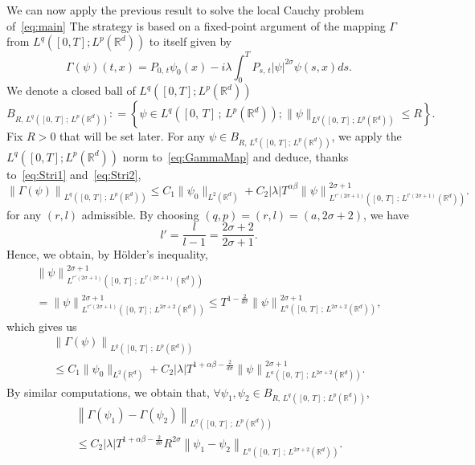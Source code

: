 \documentclass[AHL,Unicode,longabstracts,published]{cedram}
\newcommand{\bbR}{\mathbb{R}}
\let\oldforall\forall
\renewcommand*{\forall}{\mathrel{\oldforall}}
\begin{document}
We can now apply the previous result to solve the local Cauchy problem of~\eqref{eq:main} The strategy is based on a fixed-point argument of the mapping $\Gamma$ from $L^{q}([0,T];L^p(\bbR^d))$ to itself given by
\begin{equation}\label{eq:GammaMap}
\Gamma(\psi)(t,x) = P_{0,\,t}\psi_0(x) - i\lambda \int_0^T P_{s,\,t}|\psi|^{2\sigma}\psi(s,x) ds.
\end{equation}
We denote a closed ball of $L^{q}([0,T];L^p(\bbR^d))$
\[
B_{R,\,L^{q}\left([0,\,T]\,;\,L^p\left(\bbR^d\right)\right)} : = \left\{ \psi \in L^{q}\left([0,\,T]\,;\,L^p\left(\bbR^d\right)\right); \|\psi\|_{L^{q}\left([0,\,T]\,;\,L^p\left(\bbR^d\right)\right)} \leq R\right\}.
\]
Fix $R>0$ that will be set later. For any $\psi \in B_{R,\,L^{q}([0,\,T];\,L^p(\bbR^d))}$, we apply the $L^q([0,T];L^p(\bbR^d))$ norm to~\eqref{eq:GammaMap} and deduce, thanks to~\eqref{eq:Stri1} and~\eqref{eq:Stri2},
\[
\left\|\Gamma(\psi)\right\|_{L^{q}\left([0,\,T]\,;\,L^p\left(\bbR^d\right)\right)}\leq C_1\|\psi_0\|_{L^2\left(\bbR^d\right)} + C_2|\lambda| T^{\alpha\beta}\left\|\psi\right\|_{L^{r'\left(2\sigma+1\right)}\left([0,\,T]\,;\,L^{l'\left(2\sigma+1\right)}\left(\bbR^d\right)\right)}^{2\sigma+1}.
\]
for any $(r,l)$ admissible. By choosing $(q,p) = (r,l) = \left(a,2\sigma+2\right)$, we have
\[
l' = \frac{l}{l-1} = \frac{2\sigma+2}{2\sigma +1}.
\]
Hence, we obtain, by H\"older's inequality,
\begin{multline*}
\left\|\psi\right\|_{L^{r'\left(2\sigma+1\right)}\left([0,\,T]\,;\,L^{l'\left(2\sigma+1\right)} \left(\bbR^d\right)\right)}^{2\sigma+1}\\
= \left\|\psi\right\|_{L^{r'\left(2\sigma+1\right)}\left([0,\,T]\,;\,L^{2\sigma+2}\left(\bbR^d\right)\right)}^{2\sigma+1} \leq T^{1-\frac{2}{d\sigma}} \left\|\psi\right\|_{L^{a}\left([0,\,T]\,;\,L^{2\sigma+2} \left(\bbR^d\right)\right)}^{2\sigma+1},
\end{multline*}
which gives us
\begin{multline}\label{eq:Gammaest1}
\left\|\Gamma(\psi)\right\|_{L^{q}\left([0,\,T]\,;\,L^p\left(\bbR^d\right)\right)}\\\leq C_1\|\psi_0\|_{L^2\left(\bbR^d\right)} + C_2|\lambda| T^{1+\alpha\beta-\frac{2}{d\sigma}} \left\|\psi\right\|_{L^{a}\left([0,\,T]\,;\,L^{2\sigma+2}\left(\bbR^d\right)\right)}^{2\sigma+1}.
\end{multline}
By similar computations, we obtain that, $\forall \psi_1,\psi_2\in B_{R,\,L^{q}([0,\,T]\,;\,L^p(\bbR^d))}$,
\begin{multline}\label{eq:Gammaest2}
\left\|\Gamma(\psi_1) - \Gamma(\psi_2)\right\|_{L^{q}\left([0,\,T]\,;\,L^p\left(\bbR^d\right)\right)}\\
\leq C_2|\lambda| T^{1+\alpha\beta-\frac{2}{d\sigma}} R^{2\sigma}\left\|\psi_1 - \psi_2\right\|_{L^{a}\left([0,\,T]\,;\,L^{2\sigma+2}\left(\bbR^d\right)\right)}.
\end{multline}
\end{document}
